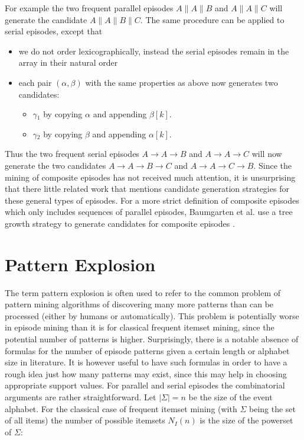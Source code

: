 For example the two frequent parallel episodes $A \| A \| B$ and $A \| A \| C$ will generate the candidate $A \| A \| B \| C$. \newline
The same procedure can be applied to serial episodes, except that
\begin{itemize}
	\item we do not order lexicographically, instead the serial episodes remain in the array in their natural order
	\item each pair $(\alpha , \beta )$ with the same properties as above now generates two candidates:
	\begin{itemize}
		\item $\gamma{_1}$ by copying $\alpha$ and appending $\beta [k]$.
		\item $\gamma{_2}$ by copying $\beta$ and appending $\alpha [k]$.
	\end{itemize}
\end{itemize}

Thus the two frequent serial episodes $A \rightarrow A \rightarrow B$ and $A \rightarrow A \rightarrow C$ will now generate the two candidates $A \rightarrow A \rightarrow B \rightarrow C$ and $A \rightarrow A \rightarrow C \rightarrow B$. \newline
Since the mining of composite episodes has not received much attention, it is unsurprising that there little related work that mentions candidate generation strategies for these general types of episodes. For a more strict definition of composite episodes which only includes sequences of parallel episodes, Baumgarten et al. use a tree growth strategy to generate candidates for composite episodes \cite{baumgarten2003tree}. 

\section{Pattern Explosion}
\label{sec_PatternExplosion}
The term pattern explosion is often used to refer to the common problem of pattern mining algorithms of discovering many more patterns than can be processed (either by humans or automatically). This problem is potentially worse in episode mining than it is for classical frequent itemset mining, since the potential number of patterns is higher. Surprisingly, there is a notable absence of formulas for the number of episode patterns given a certain length or alphabet size in literature. It is however useful to have such formulas in order to have a rough idea just how many patterns may exist, since this may help in choosing appropriate support values. For parallel and serial episodes the combinatorial arguments are rather straightforward. Let $|\Sigma| = n$ be the size of the event alphabet. For the classical case of frequent itemset mining (with $\Sigma$ being the set of all items) the number of possible itemsets $N_I(n)$ is the size of the powerset of $\Sigma$:

